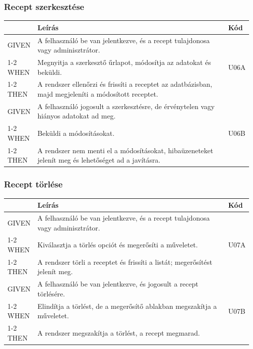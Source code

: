 \subsubsection{Recept szerkesztése}
\begin{table}[H]
	\centering
	\begin{tabular}{|m{0.12\linewidth}|m{0.78\linewidth}|m{0.08\linewidth}|}
		\hline
		& \textbf{Leírás} & \textbf{Kód} \\\hline
		GIVEN & A felhasználó be van jelentkezve, és a recept tulajdonosa vagy adminisztrátor. & \multirow{3}{*}{U06A} \\\cline{1-2}
		WHEN  & Megnyitja a szerkesztő űrlapot, módosítja az adatokat és beküldi. & \\\cline{1-2}
		THEN  & A rendszer ellenőrzi és frissíti a receptet az adatbázisban, majd megjeleníti a módosított receptet. & \\\hline

		GIVEN & A felhasználó jogosult a szerkesztésre, de érvénytelen vagy hiányos adatokat ad meg. & \multirow{3}{*}{U06B} \\\cline{1-2}
		WHEN  & Beküldi a módosításokat. & \\\cline{1-2}
		THEN  & A rendszer nem menti el a módosításokat, hibaüzeneteket jelenít meg és lehetőséget ad a javításra. & \\\hline
	\end{tabular}
\end{table}

\subsubsection{Recept törlése}
\begin{table}[H]
	\centering
	\begin{tabular}{|m{0.12\linewidth}|m{0.78\linewidth}|m{0.08\linewidth}|}
		\hline
		& \textbf{Leírás} & \textbf{Kód} \\\hline
		GIVEN & A felhasználó be van jelentkezve, és a recept tulajdonosa vagy adminisztrátor. & \multirow{3}{*}{U07A} \\\cline{1-2}
		WHEN  & Kiválasztja a törlés opciót és megerősíti a műveletet. & \\\cline{1-2}
		THEN  & A rendszer törli a receptet és frissíti a listát; megerősítést jelenít meg. & \\\hline

		GIVEN & A felhasználó be van jelentkezve, és jogosult a recept törlésére. & \multirow{3}{*}{U07B} \\\cline{1-2}
		WHEN  & Elindítja a törlést, de a megerősítő ablakban megszakítja a műveletet. & \\\cline{1-2}
		THEN  & A rendszer megszakítja a törlést, a recept megmarad. & \\\hline
	\end{tabular}
\end{table}

